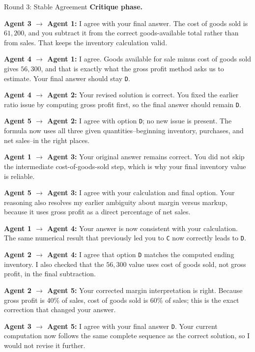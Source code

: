 \begin{roundbox}{Round 3: Stable Agreement}
\textbf{Critique phase.}

\textbf{Agent 3 $\rightarrow$ Agent 1:} I agree with your final answer. The cost of goods sold is $61{,}200$, and you subtract it from the correct goods-available total rather than from sales. That keeps the inventory calculation valid.

\textbf{Agent 4 $\rightarrow$ Agent 1:} I agree. Goods available for sale minus cost of goods sold gives $56{,}300$, and that is exactly what the gross profit method asks us to estimate. Your final answer should stay \texttt{D}.

\textbf{Agent 4 $\rightarrow$ Agent 2:} Your revised solution is correct. You fixed the earlier ratio issue by computing gross profit first, so the final answer should remain \texttt{D}.

\textbf{Agent 5 $\rightarrow$ Agent 2:} I agree with option \texttt{D}; no new issue is present. The formula now uses all three given quantities--beginning inventory, purchases, and net sales--in the right places.

\textbf{Agent 1 $\rightarrow$ Agent 3:} Your original answer remains correct. You did not skip the intermediate cost-of-goods-sold step, which is why your final inventory value is reliable.

\textbf{Agent 5 $\rightarrow$ Agent 3:} I agree with your calculation and final option. Your reasoning also resolves my earlier ambiguity about margin versus markup, because it uses gross profit as a direct percentage of net sales.

\textbf{Agent 1 $\rightarrow$ Agent 4:} Your answer is now consistent with your calculation. The same numerical result that previously led you to \texttt{C} now correctly leads to \texttt{D}.

\textbf{Agent 2 $\rightarrow$ Agent 4:} I agree that option \texttt{D} matches the computed ending inventory. I also checked that the $56{,}300$ value uses cost of goods sold, not gross profit, in the final subtraction.

\textbf{Agent 2 $\rightarrow$ Agent 5:} Your corrected margin interpretation is right. Because gross profit is 40\% of sales, cost of goods sold is 60\% of sales; this is the exact correction that changed your answer.

\textbf{Agent 3 $\rightarrow$ Agent 5:} I agree with your final answer \texttt{D}. Your current computation now follows the same complete sequence as the correct solution, so I would not revise it further.


\end{roundbox}
